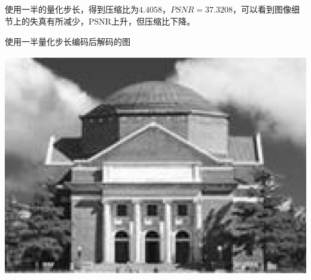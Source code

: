 \documentclass{article}
\begin{document}
\subsection{}
\noindent{}
\par 使用一半的量化步长，得到压缩比为$4.4058$，$PSNR=37.3208$，可以看到图像细节上的失真有所减少，PSNR上升，但压缩比下降。
\par 使用一半量化步长编码后解码的图
\begin{center}\includegraphics[width=\textwidth]{halfqtab.eps}\end{center}
\end{document}

